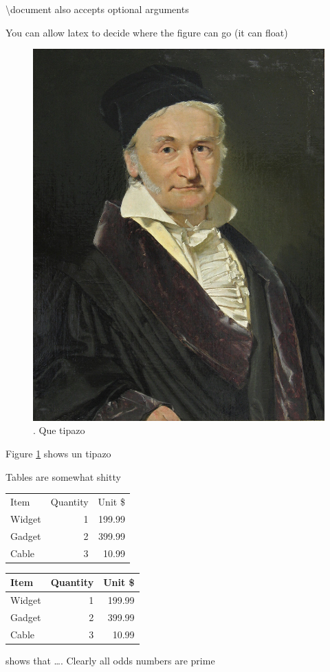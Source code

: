 \documentclass{article}
\begin{document}
\textbackslash document also accepts optional arguments

You can allow latex to decide where the figure can go (it can float)

\begin{figure}
\centering
    \includegraphics[width=.5\textwidth]{gauss.jpeg}
\caption{\label{fig:gauss}. Que tipazo}
\end{figure}

Figure \ref{fig:gauss} shows un tipazo

Tables are somewhat shitty

\begin{tabular}{lrr} %
Item    & Quantity  & Unit \$   \\
Widget  & 1         & 199.99    \\
Gadget  & 2         & 399.99    \\
Cable   & 3         & 10.99     \\
\end{tabular}

\begin{tabular}{|l|r|r|} \hline %
Item    & Quantity  & Unit \$   \\\hline
Widget  & 1         & 199.99    \\
Gadget  & 2         & 399.99    \\
Cable   & 3         & 10.99     \\\hline
\end{tabular}


\citet{Brooks1997Methodology} shows that \ldots. Clearly all odds numbers
are prime \citep{Jacobson1999Towards}


\end{document}
